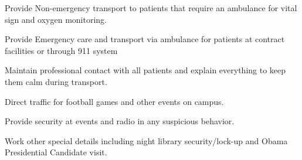 \documentclass[]{deedy-resume-openfont}
\begin{document}
\begin{minipage}[t]{0.66\textwidth}
{}
\begin{tightemize}
\item Provide Non-emergency transport to patients that require an ambulance for vital sign and oxygen monitoring. 
\item  Provide Emergency care and transport via ambulance for patients at contract facilities or through 911 system
\item Maintain professional contact with all patients and explain everything to keep them calm during transport.
\end{tightemize}
\sectionsep

\begin{tightemize}
\item Direct traffic for football games and other events on campus.
\item Provide security at events and radio in any suspicious behavior.
\item Work other special details including night library security/lock-up and Obama Presidential Candidate visit.
\end{tightemize}
\sectionsep



\end{minipage}
\end{document}
